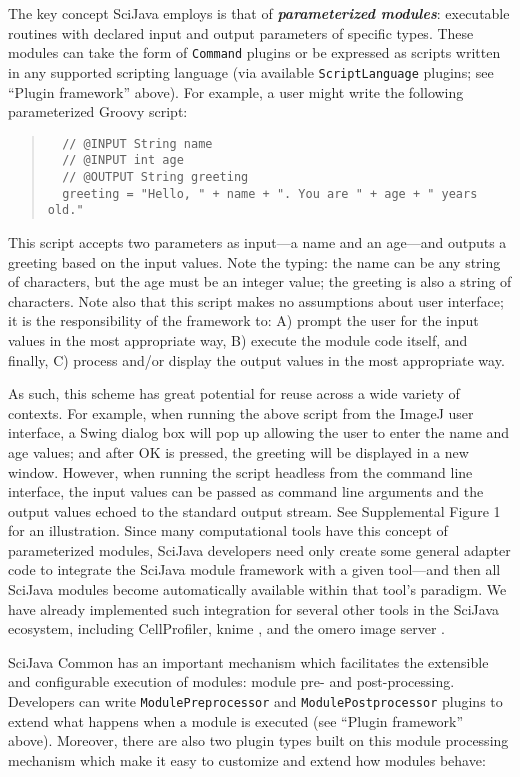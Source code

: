 \documentclass{bmcart}
\begin{document}
The key concept SciJava employs is that of \textbf{\textit{parameterized
modules}}: executable routines with declared input and output parameters of
specific types. These modules can take the form of \texttt{Command} plugins or
be expressed as scripts written in any supported scripting language (via
available \texttt{ScriptLanguage} plugins; see ``Plugin framework'' above). For
example, a user might write the following parameterized Groovy script:

\begin{quote}
  \small
  \begin{verbatim}
  // @INPUT String name
  // @INPUT int age
  // @OUTPUT String greeting
  greeting = "Hello, " + name + ". You are " + age + " years old."\end{verbatim}
\end{quote}

This script accepts two parameters as input---a name and an age---and outputs a
greeting based on the input values. Note the typing: the name can be any string
of characters, but the age must be an integer value; the greeting is also a
string of characters. Note also that this script makes no assumptions about
user interface; it is the responsibility of the framework to: A) prompt the
user for the input values in the most appropriate way, B) execute the module
code itself, and finally, C) process and/or display the output values in the
most appropriate way.

As such, this scheme has great potential for reuse across a wide variety of
contexts. For example, when running the above script from the ImageJ user
interface, a Swing dialog box will pop up allowing the user to enter the name
and age values; and after OK is pressed, the greeting will be displayed in a
new window. However, when running the script headless from the command line
interface, the input values can be passed as command line arguments and the
output values echoed to the standard output stream. See Supplemental Figure 1
for an illustration. Since many computational tools have this concept of
parameterized modules, SciJava developers need only create some general adapter
code to integrate the SciJava module framework with a given tool---and then all
SciJava modules become automatically available within that tool's paradigm. We
have already implemented such integration for several other tools in the
SciJava ecosystem, including CellProfiler, \acrshort{knime} \cite{knip}, and
the \acrshort{omero} image server \cite{omero}.

SciJava Common has an important mechanism which facilitates the extensible and
configurable execution of modules: module pre- and post-processing. Developers
can write \texttt{ModulePreprocessor} and \texttt{ModulePostprocessor} plugins
to extend what happens when a module is executed (see ``Plugin framework''
above). Moreover, there are also two plugin types built on this module
processing mechanism which make it easy to customize and extend how modules
behave:
\end{document}
